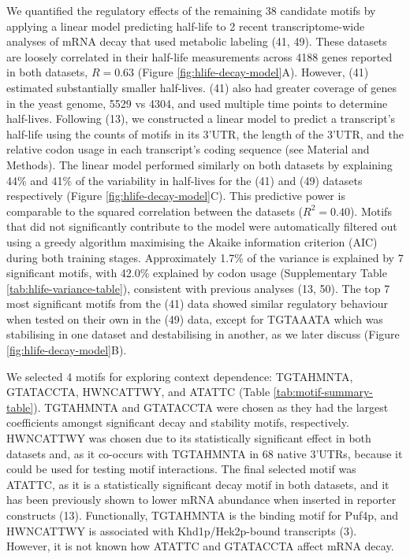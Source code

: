 \documentclass{SBCbookchapter}
\begin{document}
We quantified the regulatory effects of the remaining 38 candidate motifs by applying a linear model predicting half-life to 2 recent transcriptome-wide analyses of mRNA decay that used metabolic labeling (41, 49).
These datasets are loosely correlated in their half-life measurements across 4188 genes reported in both datasets, \(R = 0.63\) (Figure \ref{fig:hlife-decay-model}A). However, (41) estimated substantially smaller half-lives.
(41) also had greater coverage of genes in the yeast genome, 5529 vs 4304, and used multiple time points to determine half-lives.
Following (13), we constructed a linear model to predict a transcript's half-life using the counts of motifs in its 3'UTR, the length of the 3'UTR, and the relative codon usage in each transcript's coding sequence (see Material and Methods).
The linear model performed similarly on both datasets by explaining 44\% and 41\% of the variability in half-lives for the (41) and (49) datasets respectively (Figure \ref{fig:hlife-decay-model}C).
This predictive power is comparable to the squared correlation between the datasets (\(R^2 = 0.40\)).
Motifs that did not significantly contribute to the model were automatically filtered out using a greedy algorithm maximising the Akaike information criterion (AIC) during both training stages.
Approximately 1.7\% of the variance is explained by 7 significant motifs, with 42.0\% explained by codon usage (Supplementary Table \ref{tab:hlife-variance-table}), consistent with previous analyses (13, 50).
The top 7 most significant motifs from the (41) data showed similar regulatory behaviour when tested on their own in the (49) data, except for TGTAAATA which was stabilising in one dataset and destabilising in another, as we later discuss (Figure \ref{fig:hlife-decay-model}B).

We selected 4 motifs for exploring context dependence: TGTAHMNTA, GTATACCTA, HWNCATTWY, and ATATTC (Table \ref{tab:motif-summary-table}).
TGTAHMNTA and GTATACCTA were chosen as they had the largest coefficients amongst significant decay and stability motifs, respectively.
HWNCATTWY was chosen due to its statistically significant effect in both datasets and, as it co-occurs with TGTAHMNTA in 68 native 3'UTRs, because it could be used for testing motif interactions.
The final selected motif was ATATTC, as it is a statistically significant decay motif in both datasets, and it has been previously shown to lower mRNA abundance when inserted in reporter constructs (13).
Functionally, TGTAHMNTA is the binding motif for Puf4p, and HWNCATTWY is associated with Khd1p/Hek2p-bound transcripts (3).
However, it is not known how ATATTC and GTATACCTA affect mRNA decay.
\end{document}
